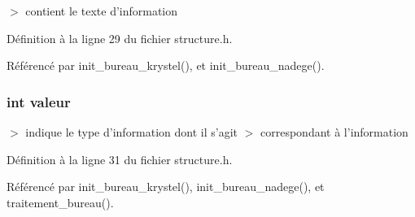 $>$ contient le texte d'information 



D\'{e}finition \`{a} la ligne 29 du fichier structure.h.

R\'{e}f\'{e}renc\'{e} par init\_\-bureau\_\-krystel(), et init\_\-bureau\_\-nadege().
\subsubsection{\setlength{\rightskip}{0pt plus 5cm}int {\bf valeur}}\label{structinformation_8e030c012e3b74a6d076739c4c7ecb69}


$>$ indique le type d'information dont il s'agit $>$ correspondant \`{a} l'information 

D\'{e}finition \`{a} la ligne 31 du fichier structure.h.

R\'{e}f\'{e}renc\'{e} par init\_\-bureau\_\-krystel(), init\_\-bureau\_\-nadege(), et traitement\_\-bureau().